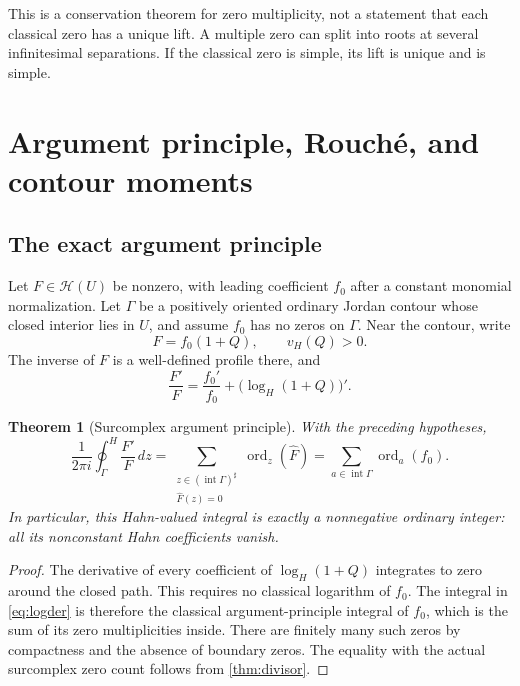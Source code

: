 \documentclass[11pt,a4paper]{article}
\numberwithin{equation}{section}
\newtheorem{theorem}{Theorem}[section]
\theoremstyle{definition}
\newcommand{\HH}{\mathscr H}
\newcommand{\ord}{\operatorname{ord}}
\newcommand{\hhat}[1]{\widehat{#1}}
\newcommand{\hoint}{\oint^{\!H}}
\newcommand{\vprof}{v_{\!H}}
\begin{document}
This is a conservation theorem for zero multiplicity, not a statement that
each classical zero has a unique lift. A multiple zero can split into roots
at several infinitesimal separations. If the classical zero is simple,
its lift is unique and is simple.

\section{Argument principle, Rouch\'e, and contour moments}

\subsection{The exact argument principle}

Let $F\in\HH(U)$ be nonzero, with leading coefficient $f_0$ after a constant
monomial normalization. Let $\Gamma$ be a positively oriented ordinary Jordan
contour whose closed interior lies in $U$, and assume $f_0$ has no zeros on
$\Gamma$. Near the contour, write
\[
 F=f_0(1+Q),\qquad\vprof(Q)>0.
\]
The inverse of $F$ is a well-defined profile there, and
\begin{equation}\label{eq:logder}
 \frac{F'}F=\frac{f_0'}{f_0}+
              \bigl(\log_H(1+Q)\bigr)'.
\end{equation}

\begin{theorem}[Surcomplex argument principle]\label{thm:argument}
With the preceding hypotheses,
\begin{equation}\label{eq:argument}
 \frac1{2\pi i}\hoint_\Gamma\frac{F'}F\,dz
  =\sum_{\substack{z\in(\operatorname{int}\Gamma)^\sharp\\\hhat F(z)=0}}
           \ord_z(\hhat F)
  =\sum_{a\in\operatorname{int}\Gamma}\ord_a(f_0).
\end{equation}
In particular, this Hahn-valued integral is exactly a nonnegative ordinary
integer: all its nonconstant Hahn coefficients vanish.
\end{theorem}
\begin{proof}
The derivative of every coefficient of $\log_H(1+Q)$ integrates to zero
around the closed path. This requires no classical logarithm of $f_0$.
The integral in \eqref{eq:logder} is therefore the classical argument-principle
integral of $f_0$, which is the sum of its zero multiplicities inside.
There are finitely many such zeros by compactness and the absence of boundary
zeros. The equality with the actual surcomplex zero count follows from
\cref{thm:divisor}.
\end{proof}
\end{document}
